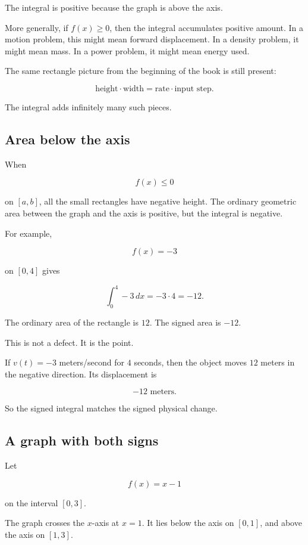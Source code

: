 The integral is positive because the graph is above the axis.

More generally, if \(f(x)\ge0\), then the integral accumulates positive amount.  In a
motion problem, this might mean forward displacement.  In a density problem, it might
mean mass.  In a power problem, it might mean energy used.

The same rectangle picture from the beginning of the book is still present:

\[
\text{height}\cdot\text{width}
=
\text{rate}\cdot\text{input step}.
\]

The integral adds infinitely many such pieces.

\subsection{Area below the axis}
\label{subsec:area-below-axis}

When

\[
f(x)\le 0
\]

on \([a,b]\), all the small rectangles have negative height.  The ordinary geometric area
between the graph and the axis is positive, but the integral is negative.

For example,

\[
f(x)=-3
\]

on \([0,4]\) gives

\[
\int_0^4 -3\,dx=-3\cdot4=-12.
\]

The ordinary area of the rectangle is \(12\).  The signed area is \(-12\).

This is not a defect.  It is the point.

If \(v(t)=-3\) meters/second for \(4\) seconds, then the object moves \(12\) meters in
the negative direction.  Its displacement is

\[
-12\text{ meters}.
\]

So the signed integral matches the signed physical change.

\subsection{A graph with both signs}
\label{subsec:graph-with-both-signs}

Let

\[
f(x)=x-1
\]

on the interval \([0,3]\).

The graph crosses the \(x\)-axis at \(x=1\).  It lies below the axis on \([0,1]\), and above
the axis on \([1,3]\).

